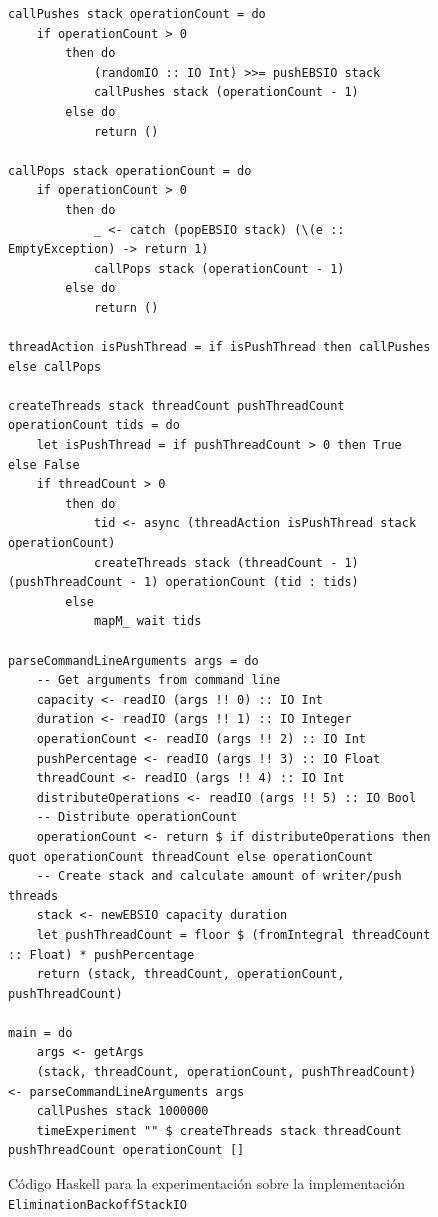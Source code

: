 \begin{figure}[H]
    \centering
    \begin{verbatim}
callPushes stack operationCount = do
    if operationCount > 0
        then do
            (randomIO :: IO Int) >>= pushEBSIO stack
            callPushes stack (operationCount - 1)
        else do
            return ()

callPops stack operationCount = do
    if operationCount > 0
        then do
            _ <- catch (popEBSIO stack) (\(e :: EmptyException) -> return 1)
            callPops stack (operationCount - 1)
        else do
            return ()

threadAction isPushThread = if isPushThread then callPushes else callPops

createThreads stack threadCount pushThreadCount operationCount tids = do
    let isPushThread = if pushThreadCount > 0 then True else False
    if threadCount > 0
        then do
            tid <- async (threadAction isPushThread stack operationCount)
            createThreads stack (threadCount - 1) (pushThreadCount - 1) operationCount (tid : tids)
        else
            mapM_ wait tids

parseCommandLineArguments args = do
    -- Get arguments from command line
    capacity <- readIO (args !! 0) :: IO Int
    duration <- readIO (args !! 1) :: IO Integer
    operationCount <- readIO (args !! 2) :: IO Int
    pushPercentage <- readIO (args !! 3) :: IO Float
    threadCount <- readIO (args !! 4) :: IO Int
    distributeOperations <- readIO (args !! 5) :: IO Bool
    -- Distribute operationCount
    operationCount <- return $ if distributeOperations then quot operationCount threadCount else operationCount
    -- Create stack and calculate amount of writer/push threads
    stack <- newEBSIO capacity duration
    let pushThreadCount = floor $ (fromIntegral threadCount :: Float) * pushPercentage
    return (stack, threadCount, operationCount, pushThreadCount)

main = do
    args <- getArgs
    (stack, threadCount, operationCount, pushThreadCount) <- parseCommandLineArguments args
    callPushes stack 1000000
    timeExperiment "" $ createThreads stack threadCount pushThreadCount operationCount []
    \end{verbatim}
    \caption{Código Haskell para la experimentación sobre la implementación \texttt{EliminationBackoffStackIO}}
    \label{fig:expEBSIO}
\end{figure}

